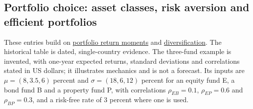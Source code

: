 \subsection{Portfolio choice: asset classes, risk aversion and efficient portfolios}

These entries build on \hyperref[meth:portfolio-return-moments]{portfolio return moments} and \hyperref[mech:diversification-correlation]{diversification}. The historical table is dated, single-country evidence. The three-fund example is invented, with one-year expected returns, standard deviations and correlations stated in US dollars; it illustrates mechanics and is not a forecast. Its inputs are $\mu=(8,3.5,6)$ percent and $\sigma=(18,6,12)$ percent for an equity fund E, a bond fund B and a property fund P, with correlations $\rho_{EB}=0.1$, $\rho_{EP}=0.6$ and $\rho_{BP}=0.3$, and a risk-free rate of 3 percent where one is used.

